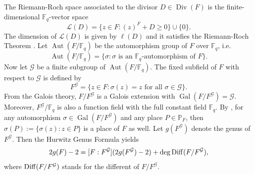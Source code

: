 \documentclass[journal,12pt,onecolumn]{IEEEtran}
\begin{document}
The Riemann-Roch space associated to the divisor $D\in\operatorname{Div}(F)$ is the finite-dimensional $\mathbb{F}_q$-vector space
\[
    \mathcal{L}(D)=\big\{z\in F: (z)^F+D\ge 0 \big\}\cup\big\{0\big\}.
\]
The dimension of $\mathcal{L}(D)$ is given by $\ell(D)$ and it satisfies the Riemann-Roch Theorem \cite[Thm. 1.5.15]{Algebraic_Function_Fields_and_Codes}. Let $\operatorname{Aut}(F/\mathbb{F}_q)$ be the automorphism group of $F$ over $\mathbb{F}_q$, i.e.
\[
    \operatorname{Aut}(F/\mathbb{F}_q)=\big\{\sigma:\sigma \text{ is an } \mathbb{F}_q\text{-automorphism of } F\big\}.
\]
Now let $\mathcal{G}$ be a finite subgroup of $\operatorname{Aut}(F/\mathbb{F}_q)$. The fixed subfield of $F$ with respect to $\mathcal{G}$ is defined by
\[
    F^{\mathcal{G}}=\big\{z\in F:\sigma(z)=z \text{ for all } \sigma\in\mathcal{G}\big\}.
\]
From the Galois theory, $F/F^{\mathcal{G}}$ is a Galois extension with $\operatorname{Gal}(F/F^{\mathcal{G}})=\mathcal{G}$. Moreover, $F^{\mathcal{G}}/\mathbb{F}_q$ is also a function field with the full constant field $\mathbb{F}_q$. By \cite[Lem. 3.5.2]{Algebraic_Function_Fields_and_Codes}, for any automorphism $\sigma\in\operatorname{Gal}(F/F^{\mathcal{G}})$ and any place $P\in\mathbb{P}_F$, then $\sigma(P):=\{\sigma(z):z\in P\}$ is a place of $F$ as well. Let $g(F^{\mathcal{G}})$ denote the genus of $F^{\mathcal{G}}$. Then the Hurwitz Genus Formula\cite[Thm. 3.4.13]{Algebraic_Function_Fields_and_Codes} yields
\begin{equation*}
    2g(F)-2=[F:F^{\mathcal{G}}](2g(F^{\mathcal{G}})-2)+\deg {\rm{Diff}}(F/F^{\mathcal{G}}),
\end{equation*}
where ${\rm{Diff}}(F/F^{\mathcal{G}})$ stands for the different of $F/F^{\mathcal{G}}$.
\end{document}
